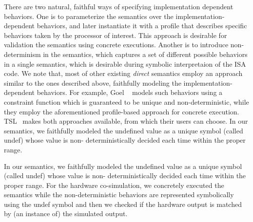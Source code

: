 There are two natural, faithful ways of specifying implementation dependent
behaviors.  One is to parameterize the semantics over the
implementation-dependent behaviors, and later instantiate it with a profile
that describes specific behaviors taken by the processor of interest. This
approach is desirable for validation the semantics using concrete executions.
Another is to introduce non-determinism in the semantics, which captures a set
of different possible behaviors in a single semantics, which is desirable
during symbolic interpretaion of the ISA code.  We note that, most of other
existing \emph{direct} \ISA semantics employ an approach similar to the ones
described above, faithfully modeling the implementation-dependent behaviors.
For example, Goel \etal~\cite{Goel:ProCoS17} models such behaviors using a
constraint function which is guaranteed to be unique and non-deterministic,
           while they employ the aforementioned profile-based approach for
           concrete execution.  TSL~\cite{TSL:TOPLAS13} makes both approaches
           available, from which their users can choose.  In our semantics, we
           faithfully modeled the undefined value as a unique symbol (called
               undef) whose value is non- deterministically decided each time
           within the proper range.

In our semantics, we faithfully modeled the undefined value as a unique symbol
(called undef) whose value is non- deterministically decided each time within
the proper range. For the hardware co-simulation, we concretely executed the
semantics while the non-deterministic behaviors are represented symbolically
using the undef symbol and then we checked if the hardware output is matched by
(an instance of) the simulated output.

